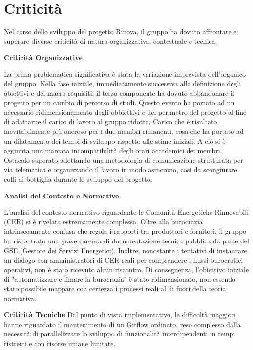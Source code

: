 \setcounter{section}{3}
\setlength{\parindent}{0pt}  %
\setlength{\parskip}{6pt}
\section{Criticità}
Nel corso dello sviluppo del progetto Rinova, il gruppo ha dovuto affrontare e superare diverse criticità di natura organizzativa, contestuale e tecnica.

\textbf{Criticità Organizzative}

La prima problematica significativa è stata la variazione imprevista dell'organico del gruppo. Nella fase iniziale, immediatamente successiva alla definizione degli obiettivi e dei macro-requisiti, il terzo componente ha dovuto abbandonare il progetto per un cambio di percorso di studi. Questo evento ha portato ad un necessario ridimensionamento degli obbiettivi e del perimetro del progetto al fine di adattarne il carico di lavoro al gruppo ridotto. Carico che è risultato inevitabilmente più oneroso per i due membri rimanenti, cosa che ha portato ad un dilatamento dei tempi di sviluppo rispetto alle stime iniziali.
A ciò si è aggiunta una marcata incompatibilità degli orari accademici dei membri. Ostacolo superato adottando una metodologia di comunicazione strutturata per via telematica e organizzando il lavoro in modo asincrono, così da scongiurare colli di bottiglia durante lo sviluppo del progetto.

\textbf{Analisi del Contesto e Normative}

L'analisi del contesto normativo riguardante le Comunità Energetiche Rinnovabili (CER) si è rivelata estremamente complessa. Oltre alla burocrazia intrinsecamente confusa che regola i rapporti tra produttori e fornitori, il gruppo ha riscontrato una grave carenza di documentazione tecnica pubblica da parte del GSE (Gestore dei Servizi Energetici).
Inoltre, nonostante i tentativi di instaurare un dialogo con amministratori di CER reali per comprendere i flussi burocratici operativi, non è stato ricevuto alcun riscontro. Di conseguenza, l'obiettivo iniziale di "automatizzare e limare la burocrazia" è stato ridimensionato, non essendo stato possibile mappare con certezza i processi reali al di fuori della teoria normativa.

\textbf{Criticità Tecniche}
Dal punto di vista implementativo, le difficoltà maggiori hanno riguardato il mantenimento di un Gitflow ordinato, reso complesso dalla necessità di parallelizzare lo sviluppo di funzionalità interdipendenti in tempi ristretti e con risorse umane limitate.

